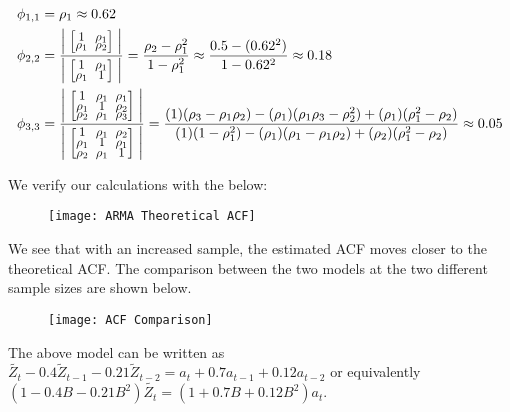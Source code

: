 \documentclass[12pt, letterpaper]{article}
\newcommand{\mymatrix}[1]{
	\renewcommand{\arraystretch}{0.5} %
	\setlength\arraycolsep{3pt}       %
	\scalebox{0.90}{                  %
		$\begin{bmatrix}
			#1
		\end{bmatrix}$
	}                   
	\renewcommand{\arraystretch}{1.0} %
	\setlength\arraycolsep{6pt}       %
}
\theoremstyle{definition}
\numberwithin{equation}{section}
\newcommand{\+}[1]{+_{\scalebox{.375}{#1}}}
\newcommand{\1}{\mathbbm{1}}
\begin{document}
\vspace{-0.5cm}
\begin{align*}
	\phi_{1,1}&=\rho_1\approx 0.62\\
	\phi_{2,2}&=\frac{\left|\mymatrix{1 & \rho_1\\
			\rho_1 &\rho_2}\right|}{\left|\mymatrix{1 & \rho_1\\
			\rho_1 &1}\right|}=\frac{\rho_2-\rho_1^2}{1-\rho_1^2}\approx \frac{0.5-(0.62^2)}{1-0.62^2}\approx 0.18\\
	\phi_{3,3}&=\frac{\left|\mymatrix{
			1 & \rho_1 & \rho_1\\
			\rho_1 &      1 & \rho_2\\
			\rho_2 & \rho_1 & \rho_3} \right|}{\left|\mymatrix{
			1 & \rho_1 & \rho_2\\
			\rho_1 &      1 & \rho_1\\
			\rho_2 & \rho_1 & 1
		}\right|}=\frac{(1)(\rho_3-\rho_1\rho_2)-(\rho_1)(\rho_1\rho_3-\rho_2^2)+(\rho_1)(\rho_1^2-\rho_2)}{(1)(1-\rho_1^2)-(\rho_1)(\rho_1-\rho_1\rho_2)+(\rho_2)(\rho_1^2-\rho_2)}\approx  0.05
\end{align*}

We verify our calculations with the below:

\begin{figure}[H]
	\centering
	\texttt{[image: ARMA Theoretical ACF]}
\end{figure}





\newpage
\textbf{}
\vspace{\baselineskip}

We see that with an increased sample, the estimated ACF moves closer to the theoretical ACF. The comparison between the two models at the two different sample sizes are shown below.

\begin{figure}[H]
	\centering
	\texttt{[image: ACF Comparison]}
\end{figure}



\newpage
\noindent\textbf{}
\vspace{\baselineskip}

The above model can be written as $\tilde{Z_t}-0.4\tilde{Z}_{t-1}-0.21\tilde{Z}_{t-2}=a_t+0.7a_{t-1}+0.12a_{t-2}$ or equivalently $\left(1-0.4B-0.21B^2\right)\tilde{Z_t}=\left(1+0.7B+0.12B^2\right)a_t$.
\vspace{\baselineskip}
\end{document}
